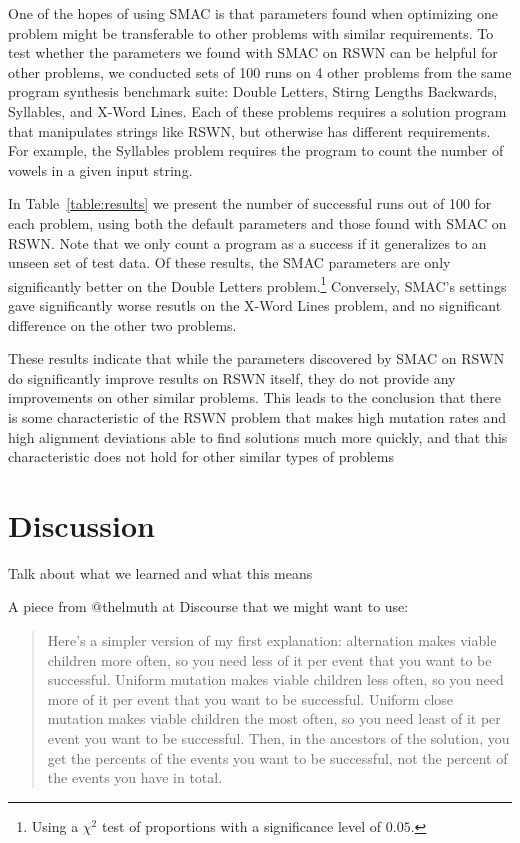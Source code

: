 One of the hopes of using SMAC is that parameters found when optimizing one problem might be transferable to other problems with similar requirements. To test whether the parameters we found with SMAC on RSWN can be helpful for other problems, we conducted sets of 100 runs on 4 other problems from the same program synthesis benchmark suite: Double Letters, Stirng Lengths Backwards, Syllables, and X-Word Lines. Each of these problems requires a solution program that manipulates strings like RSWN, but otherwise has different requirements. For example, the Syllables problem requires the program to count the number of vowels in a given input string.

In Table~\ref{table:results} we present the number of successful runs out of 100 for each problem, using both the default parameters and those found with SMAC on RSWN. Note that we only count a program as a success if it generalizes to an unseen set of test data. Of these results, the SMAC parameters are only significantly better on the Double Letters problem.\footnote{Using a $\chi^2$ test of proportions with a significance level of $0.05$.} 
Conversely, SMAC's settings gave significantly worse resutls on the X-Word Lines problem, and no significant difference on the other two problems.

These results indicate that while the parameters discovered by SMAC on RSWN do significantly improve results on RSWN itself, they do not provide any improvements on other similar problems. This leads to the conclusion that there is some characteristic of the RSWN problem that makes high mutation rates and high alignment deviations able to find solutions much more quickly, and that this characteristic does not hold for other similar types of problems


\section{Discussion}
\label{sec:discussion}

Talk about what we learned and what this means

A piece from @thelmuth at Discourse that we might want to use:
\begin{quote}
	Here's a simpler version of my first explanation: alternation makes viable children more often, so you need less of it per event that you want to be successful. Uniform mutation makes viable children less often, so you need more of it per event that you want to be successful. Uniform close mutation makes viable children the most often, so you need least of it per event you want to be successful. Then, in the ancestors of the solution, you get the percents of the events you want to be successful, not the percent of the events you have in total.
\end{quote}

